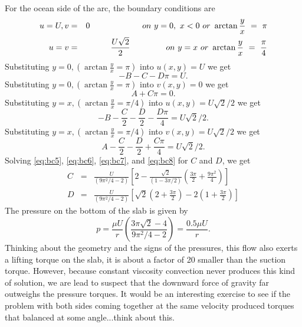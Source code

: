 \documentclass[12pt,twoside]{article}
\begin{document}
For the ocean side of the arc, the boundary conditions are
\begin{eqnarray} 
u=U, v  & = & 0 ~~~~~~~~~~~~~~~~~~~on~y=0,~x<0~or~\arctan \frac{y}{x}~=~\pi \\ 
u=v  & = & {U\sqrt{2}\over 2}~~~~~~~~~~~~~on~y=x~or~\arctan
\frac{y}{x}~=~\frac{\pi}{4} 
\end{eqnarray}
Substituting $y=0, (\arctan \frac{y}{x}= \pi )$ into $u(x,y) = U $ we get
\begin{equation}
-B - C - D \pi = U. \label{eq:bc5}
\end{equation}
Substituting $y=0, (\arctan \frac{y}{x}= \pi )$ into $v(x,y) = 0 $ we get
\begin{equation} 
A + C \pi = 0. \label{eq:bc6}
\end{equation}
Substituting $y=x, (\arctan \frac{y}{x}= \pi/4 )$ into $u(x,y) = U\sqrt{2}/2 $ we
get
\begin{equation} 
-B - \frac{C}{2} -\frac{D}{2} -\frac{D\pi}{4} =  U\sqrt{2}/2. \label{eq:bc7}
\end{equation} 
Substituting $y=x, (\arctan \frac{y}{x}= \pi/4 )$ into $v(x,y) = U\sqrt{2}/2 $
we get
\begin{equation} 
A - \frac{C}{2} -\frac{D}{2} + \frac{C\pi}{4} =  U\sqrt{2}/2. \label{eq:bc8}
\end{equation}
Solving \ref{eq:bc5}, \ref{eq:bc6}, \ref{eq:bc7}, and \ref{eq:bc8} for $C$ and
$D$, we get
\begin{eqnarray}
C & = & \frac{U}{(9\pi^2/4-2)} \left [ 2 - \frac{\sqrt{2}}{(1-3\pi/2)} \left (
\frac{3\pi}{2} + \frac{9\pi^2}{4} \right ) \right ] \\
D & = & \frac{U}{(9\pi^2/4-2)} \left [\sqrt{2} \left (2+\frac{3\pi}{2} \right )
-2 \left ( 1+\frac{3\pi}{2} \right ) \right ]
\end{eqnarray}
The pressure on the bottom of the slab is given by
\begin{equation}
p= \frac{\mu U}{r} \left ( \frac{3\pi\sqrt{2} -4}{9\pi^2/4-2} \right ) =
\frac{0.5 \mu U}{r}.
\end{equation}
Thinking about the geometry and the signs of the pressures, this flow also
exerts a lifting torque on the slab, it is about a factor of 20 smaller than
the suction torque.   However, because constant viscosity convection never
produces this kind of solution, we are lead to suspect that the downward force
of gravity far outweighs the pressure torques.   It would be an interesting
exercise to see if the problem with both sides coming together at the same
velocity produced torques that balanced at some angle...think about this.
\end{document}
